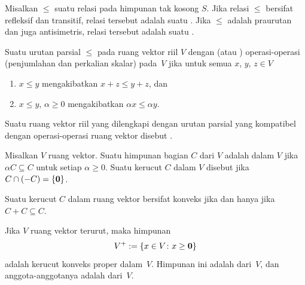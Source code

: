 \begin{defn} Misalkan $\le$ suatu relasi pada himpunan tak kosong $S$. Jika relasi
 $\le$ bersifat refleksif dan transitif, relasi tersebut adalah suatu
. Jika $\le$ adalah praurutan dan juga antisimetris, relasi tersebut adalah suatu
.

Suatu urutan parsial $\le$ pada ruang vektor riil $V$
 dengan (atau
) operasi-operasi (penjumlahan dan perkalian skalar) pada~$V$ jika untuk semua $x$,
$y$, $z \in V$
 \begin{enumerate}
  \item[(a)] $x \le y$ mengakibatkan $x+z \le y+z$, dan
  \item[(b)] $x \le y$, $\alpha \ge 0$ mengakibatkan $\alpha x \le \alpha y$.
 \end{enumerate}
Suatu ruang vektor riil yang dilengkapi dengan urutan parsial yang kompatibel dengan operasi-operasi
ruang vektor disebut
.
\end{defn}

\begin{defn} Misalkan $V$ ruang vektor. Suatu himpunan bagian $C$ dari $V$ adalah
 dalam $V$ jika $\alpha C \subseteq C$ untuk setiap $\alpha \ge 0$. Suatu kerucut $C$ dalam $V$
disebut
 jika $C \cap (-C) = \{\mathbf{0}\}$.
\end{defn}

\begin{prop}\label{0018006} Suatu kerucut $C$ dalam ruang vektor bersifat konveks jika dan hanya jika $C + C
\subseteq C$.
\end{prop}

\begin{exam}\label{0018007} Jika $V$ ruang vektor terurut, maka himpunan
   \[ V^+ := \{x \in V \colon x \ge \mathbf{0}\} \]
adalah kerucut konveks proper dalam~$V$. Himpunan ini adalah
 dari~$V$, dan anggota-anggotanya adalah
 dari~$V$.
\end{exam}

